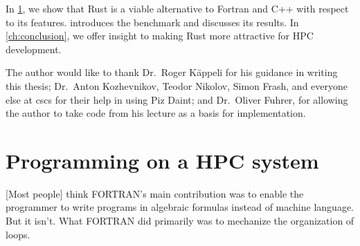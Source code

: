 \documentclass[british]{scrreprt}
\newcommand{\done}{\rlap{$\square$}{\raisebox{2pt}{\large\hspace{1pt}\ding{51}}}%
\hspace{-2.5pt}}
\begin{document}
In \cref{ch:programming-hpc}, we show that Rust is a viable alternative to Fortran and C++ with respect to its features.  introduces the benchmark and discusses its results. In \cref{ch:conclusion}, we offer insight to making Rust more attractive for HPC development.

The author would like to thank Dr.\ Roger Käppeli for his guidance in writing this thesis; Dr.\ Anton Kozhevnikov, Teodor Nikolov, Simon Frash, and everyone else at \gls{cscs} for their help in using Piz Daint; and Dr.\ Oliver Fuhrer, for allowing the author to take code from his lecture  as a basis for implementation.


\chapter{Programming on a HPC system}
\label{ch:programming-hpc}
\begin{displayquote}
	{}[Most people] think FORTRAN's main contribution was to enable the programmer to write programs in algebraic formulas instead of machine language. But it isn't. What FORTRAN did primarily was to mechanize the organization of loops.
\end{displayquote}
\end{document}
